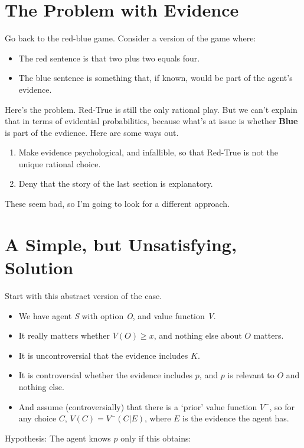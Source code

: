 \section*{The Problem with Evidence}
Go back to the red-blue game. Consider a version of the game where:

\begin{itemize}
\item The red sentence is that two plus two equals four.

\item The blue sentence is something that, if known, would be part of the agent's evidence.

\end{itemize}
Here's the problem. Red-True is still the only rational play. But we can't explain that in terms of evidential probabilities, because what's at issue is whether \textbf{Blue} is part of the evdience. Here are some ways out.

\begin{enumerate}
\item Make evidence psychological, and infallible, so that Red-True is not the unique rational choice.
\item Deny that the story of the last section is explanatory.
\end{enumerate}
These seem bad, so I'm going to look for a different approach.

\section*{A Simple, but Unsatisfying, Solution}
Start with this abstract version of the case.
\begin{itemize} 
\item We have agent \emph{S} with option \emph{O}, and value function \emph{V}.
\item It really matters whether $V(O) \geq x$, and nothing else about $O$ matters.
\item It is uncontroversial that the evidence includes $K$.
\item It is controversial whether the evidence includes $p$, and $p$ is relevant to $O$ and nothing else.
\item And assume (controversially) that there is a `prior' value function $V^-$, so for any choice $C$, $V(C) = V^-(C | E)$, where $E$ is the evidence the agent has.
\end{itemize}
Hypothesis: The agent knows $p$ only if this obtains:

